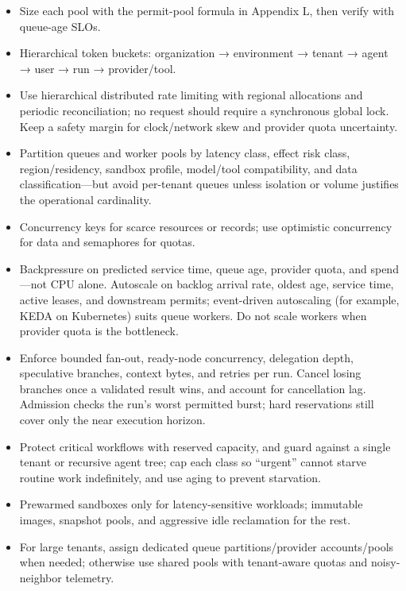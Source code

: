 \begin{itemize}

\item Size each pool with the permit-pool formula in Appendix L, then verify with queue-age SLOs.

\item Hierarchical token buckets: organization → environment → tenant → agent → user → run → provider/tool.

\item Use hierarchical distributed rate limiting with regional allocations and periodic reconciliation; no request should require a synchronous global lock. Keep a safety margin for clock/network skew and provider quota uncertainty.

\item Partition queues and worker pools by latency class, effect risk class, region/residency, sandbox profile, model/tool compatibility, and data classification—but avoid per-tenant queues unless isolation or volume justifies the operational cardinality.

\item Concurrency keys for scarce resources or records; use optimistic concurrency for data and semaphores for quotas.

\item Backpressure on predicted service time, queue age, provider quota, and spend—not CPU alone. Autoscale on backlog arrival rate, oldest age, service time, active leases, and downstream permits; event-driven autoscaling (for example, KEDA on Kubernetes) suits queue workers. Do not scale workers when provider quota is the bottleneck.

\item Enforce bounded fan-out, ready-node concurrency, delegation depth, speculative branches, context bytes, and retries per run. Cancel losing branches once a validated result wins, and account for cancellation lag. Admission checks the run’s worst permitted burst; hard reservations still cover only the near execution horizon.

\item Protect critical workflows with reserved capacity, and guard against a single tenant or recursive agent tree; cap each class so “urgent” cannot starve routine work indefinitely, and use aging to prevent starvation.

\item Prewarmed sandboxes only for latency-sensitive workloads; immutable images, snapshot pools, and aggressive idle reclamation for the rest.

\item For large tenants, assign dedicated queue partitions/provider accounts/pools when needed; otherwise use shared pools with tenant-aware quotas and noisy-neighbor telemetry.

\end{itemize}


